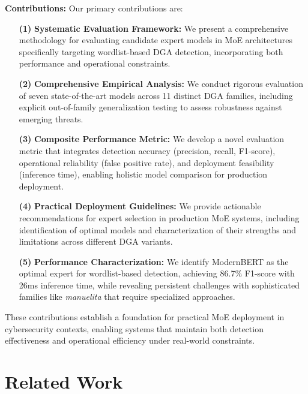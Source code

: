 \documentclass[a4paper]{llncs}
\begin{document}
\textbf{Contributions:} Our primary contributions are:
\begin{enumerate}
    \item[\textbf{(1)}] \textbf{Systematic Evaluation Framework:} We present a comprehensive methodology for evaluating candidate expert models in MoE architectures specifically targeting wordlist-based DGA detection, incorporating both performance and operational constraints.

    \item[\textbf{(2)}] \textbf{Comprehensive Empirical Analysis:} We conduct rigorous evaluation of seven state-of-the-art models across 11 distinct DGA families, including explicit out-of-family generalization testing to assess robustness against emerging threats.

    \item[\textbf{(3)}] \textbf{Composite Performance Metric:} We develop a novel evaluation metric that integrates detection accuracy (precision, recall, F1-score), operational reliability (false positive rate), and deployment feasibility (inference time), enabling holistic model comparison for production deployment.

    \item[\textbf{(4)}] \textbf{Practical Deployment Guidelines:} We provide actionable recommendations for expert selection in production MoE systems, including identification of optimal models and characterization of their strengths and limitations across different DGA variants.

    \item[\textbf{(5)}] \textbf{Performance Characterization:} We identify ModernBERT as the optimal expert for wordlist-based detection, achieving 86.7\% F1-score with 26ms inference time, while revealing persistent challenges with sophisticated families like \textit{manuelita} that require specialized approaches.
\end{enumerate}

These contributions establish a foundation for practical MoE deployment in cybersecurity contexts, enabling systems that maintain both detection effectiveness and operational efficiency under real-world constraints.





\section{Related Work}
\label{sec:Related work}
\end{document}
